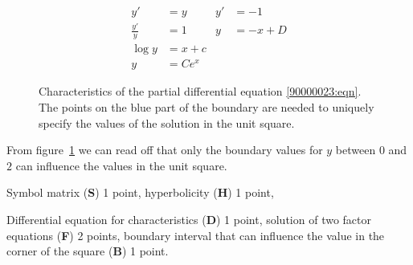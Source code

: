 \begin{loesung}
\begin{teilaufgaben}
\begin{align*}
y'           &=y            &       y'   &= -1                     \\
\frac{y'}{y} &=1            &       y    &= -x + D                 \\
\log y       &= x + c \\
           y &= Ce^x
\end{align*}
\begin{figure}
\centering
{}
\caption{Characteristics of the partial differential equation
\eqref{90000023:eqn}.
The points on the blue part of the boundary are needed to uniquely 
specify the values of the solution in the unit square.
\label{90000023:fig}}
\end{figure}%
From figure~\ref{90000023:fig} we can read off that only the boundary
values  for $y$ between $0$ and $2$ can influence the values in the
unit square.
\qedhere
\end{teilaufgaben}
\end{loesung}

\begin{bewertung}
\begin{teilaufgaben}
\item Symbol matrix ({\bf S}) 1 point,
hyperbolicity ({\bf H}) 1 point,
\item Differential equation for characteristics ({\bf D}) 1 point,
solution of two factor equations ({\bf F}) 2 points,
boundary interval that can influence the value in the corner of the
square ({\bf B}) 1 point.
\end{teilaufgaben}
\end{bewertung}

